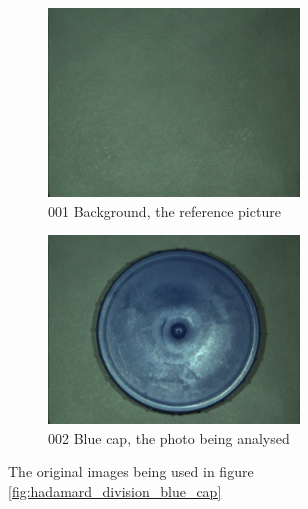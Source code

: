 \begin{figure}[h]
    \begin{subfigure}{0.5\textwidth}
        \includegraphics[width=0.9\linewidth, height=5cm]{figures/camera_pictures_png/001_background.png}
        \caption{001 Background, the reference picture}
        \label{fig:001_background}
        \end{subfigure}%
        \begin{subfigure}{0.5\textwidth}
        \includegraphics[width=0.9\linewidth, height=5cm]{figures/camera_pictures_png/002_blue_cap.png}
        \caption{002 Blue cap, the photo being analysed}
        \label{fig:002_blue_cap}
    \end{subfigure}
    
    \caption{The original images being used in figure \ref{fig:hadamard_division_blue_cap}}
    \label{fig:blue_cap_and_background}
\end{figure}



